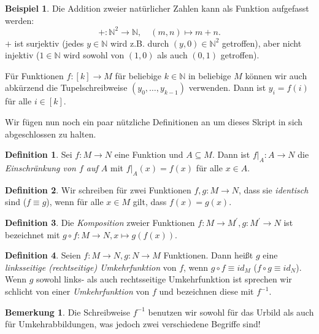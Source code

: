 \documentclass[11pt, a4paper]{article}
\theoremstyle{definition}
\newtheorem{definition}{Definition}[section]
\newtheorem*{example*}{Beispiel}
\newtheorem*{remark*}{Bemerkung}
\theoremstyle{plain}
\numberwithin{equation}{section}
\begin{document}
\begin{example*}
	Die Addition zweier natürlicher Zahlen kann als Funktion aufgefasst werden:
	$$
		+\colon \mathbb{N}^2 \to \mathbb{N}, \quad (m, n) \mapsto m+n.
	$$
	$+$ ist surjektiv (jedes $y \in \mathbb{N}$ wird z.B. durch $(y, 0) \in \mathbb{N}^2$ getroffen), aber nicht injektiv ($1 \in \mathbb{N}$ wird sowohl von $(1, 0)$ als auch $(0, 1)$ getroffen).
\end{example*}
Für Funktionen $f\colon [k] \to M$ für beliebige $k \in \mathbb{N}$ in beliebige $M$ können wir auch abkürzend die Tupelschreibweise $(y_0, \ldots, y_{k-1})$ verwenden. Dann ist $y_i = f(i)$ für alle $i \in [k]$.\par
Wir fügen nun noch ein paar nützliche Definitionen an um dieses Skript in sich abgeschlossen zu halten.
\begin{definition}
	Sei $f\colon M \to N$ eine Funktion und $A \subseteq M$. Dann ist $f\vert_A\colon A \to N$ die \textit{Einschränkung von $f$ auf $A$} mit $f\vert_A(x) = f(x)$ für alle $x \in A$.
\end{definition}
\begin{definition}
	Wir schreiben für zwei Funktionen $f, g\colon M \to N$, dass sie \textit{identisch} sind ($f \equiv g$), wenn für alle $x \in M$ gilt, dass $f(x) = g(x)$.
\end{definition}
\begin{definition}
	Die \textit{Komposition} zweier Funktionen $f\colon M \to M^\prime, g\colon M^\prime \to N$ ist bezeichnet mit $g \circ f\colon M \to N, x \mapsto g(f(x))$.
\end{definition}
\begin{definition}
	Seien $f\colon M \to N, g\colon N \to M$ Funktionen. Dann heißt $g$ eine \textit{linksseitige (rechtseitige) Umkehrfunktion} von $f$, wenn $g \circ f \equiv id_M$ ($f \circ g \equiv id_N$). Wenn $g$ sowohl links- als auch rechtsseitige Umkehrfunktion ist sprechen wir schlicht von einer \textit{Umkehrfunktion} von $f$ und bezeichnen diese mit $f^{-1}$.
\end{definition}
\begin{remark*}
	Die Schreibweise $f^{-1}$ benutzen wir sowohl für das Urbild als auch für Umkehrabbildungen, was jedoch zwei verschiedene Begriffe sind!
\end{remark*}
\end{document}
